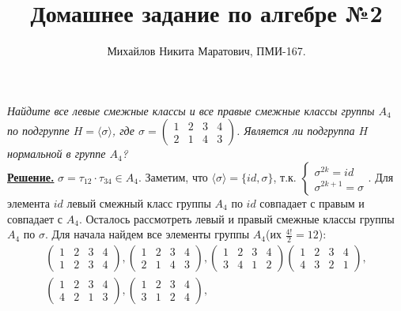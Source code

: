 \documentclass[14pt,a4paper]{scrartcl}
\title{
 Домашнее задание по алгебре №2\\
}
\author{
	Михайлов Никита Маратович, ПМИ-167.\\
}
\date{}
\begin{document}
\maketitle
\begin{spacing}{1}
	\begin{center}
	\end{center}
	\textit{Найдите все левые смежные классы и все правые смежные классы группы
		$A_4$ по подгруппе $H = \langle \sigma \rangle$, где $\sigma =
		\left(
		\begin{array}{cccc}
			1 & 2 & 3 & 4 \\
			2& 1 & 4 & 3 
		\end{array}
		\right)$. Является ли подгруппа $H$ нормальной в группе $A_4$?} \\
	\noindent \underline{\textbf{Решение.}} $\sigma = \tau_{12}\cdot\tau_{34} \in A_4$. Заметим, что $\langle \sigma \rangle = \{id, \sigma\}$, т.к. 
	$\begin{cases}
		\sigma^{2k} = id \\
		\sigma^{2k+1} = \sigma
	\end{cases}$. 
	Для элемента $id$ левый смежный класс группы $A_4$ по $id$ совпадает с правым и совпадает с $A_4$. Осталось рассмотреть левый и правый смежные классы группы $A_4$ по $\sigma$. Для начала найдем все элементы группы $A_4$(их $\frac{4!}{2} = 12$):
	\begin{gather*}
	\begin{pmatrix}
	1 & 2 & 3 & 4 \\
	1 & 2 & 3 & 4
	\end{pmatrix},
	\begin{pmatrix}
	1 & 2 & 3 & 4 \\
	2 & 1 & 4 & 3
	\end{pmatrix},
	\begin{pmatrix}
	1 & 2 & 3 & 4 \\
	3 & 4 & 1 & 2
	\end{pmatrix}
	\begin{pmatrix}
	1 & 2 & 3 & 4 \\
	4 & 3 & 2 & 1
	\end{pmatrix}, \\
	\begin{pmatrix}
	1 & 2 & 3 & 4 \\
	4 & 2 & 1 & 3
	\end{pmatrix},
	\begin{pmatrix}
	1 & 2 & 3 & 4 \\
	3 & 1 & 2 & 4
	\end{pmatrix},

\end{gather*}
\end{spacing}
\end{document}
